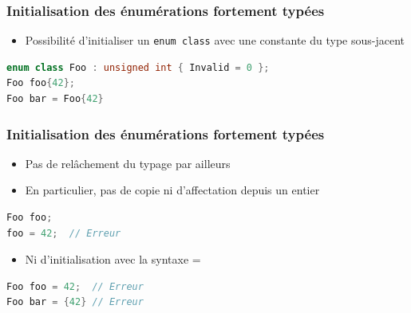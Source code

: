\documentclass[C++.tex]{subfiles}
\begin{document}
\begin{frame}[fragile]
	\frametitle{Initialisation des énumérations fortement typées}
	\begin{itemize}
		\item Possibilité d'initialiser un \lstinline|enum class| avec une constante du type sous-jacent
	\end{itemize}

	\begin{lstlisting}[language=C++]
enum class Foo : unsigned int { Invalid = 0 };
Foo foo{42};
Foo bar = Foo{42}\end{lstlisting}
\end{frame}

\begin{frame}[fragile]
	\frametitle{Initialisation des énumérations fortement typées}
	\begin{itemize}
		\item Pas de relâchement du typage par ailleurs
		\item En particulier, pas de copie ni d'affectation depuis un entier
	\end{itemize}

	\begin{lstlisting}[language=C++]
Foo foo;
foo = 42;  // Erreur\end{lstlisting}

	\begin{itemize}
		\item Ni d'initialisation avec la syntaxe =
	\end{itemize}

	\begin{lstlisting}[language=C++]
Foo foo = 42;  // Erreur
Foo bar = {42} // Erreur\end{lstlisting}
\end{frame}
\end{document}
